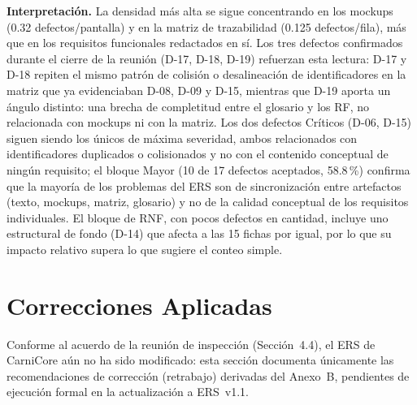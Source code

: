 \documentclass[11pt,a4paper]{article}
\begin{document}
\textbf{Interpretación.} La densidad más alta se sigue concentrando en los mockups (0.32 defectos/pantalla) y en la matriz de trazabilidad (0.125 defectos/fila), más que en los requisitos funcionales redactados en sí. Los tres defectos confirmados durante el cierre de la reunión (D-17, D-18, D-19) refuerzan esta lectura: D-17 y D-18 repiten el mismo patrón de colisión o desalineación de identificadores en la matriz que ya evidenciaban D-08, D-09 y D-15, mientras que D-19 aporta un ángulo distinto: una brecha de completitud entre el glosario y los RF, no relacionada con mockups ni con la matriz. Los dos defectos Críticos (D-06, D-15) siguen siendo los únicos de máxima severidad, ambos relacionados con identificadores duplicados o colisionados y no con el contenido conceptual de ningún requisito; el bloque Mayor (10 de 17 defectos aceptados, 58.8\,\%) confirma que la mayoría de los problemas del ERS son de sincronización entre artefactos (texto, mockups, matriz, glosario) y no de la calidad conceptual de los requisitos individuales. El bloque de RNF, con pocos defectos en cantidad, incluye uno estructural de fondo (D-14) que afecta a las 15 fichas por igual, por lo que su impacto relativo supera lo que sugiere el conteo simple.

\section{Correcciones Aplicadas}
Conforme al acuerdo de la reunión de inspección (Sección~4.4), el ERS de CarniCore aún no ha sido modificado: esta sección documenta únicamente las recomendaciones de corrección (retrabajo) derivadas del Anexo~B, pendientes de ejecución formal en la actualización a ERS~v1.1.
\end{document}
